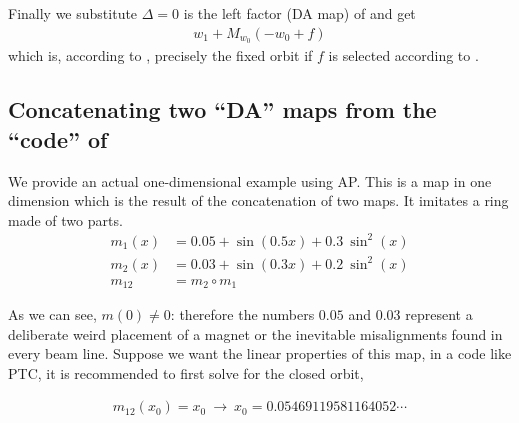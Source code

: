 \documentclass{hitec}     %
\begin{document}
{{{{{Finally we substitute $\Delta =0$ is the left factor (DA map) of  and get
%
\begin{align} {w}_{1}+{M}_{{w}_{0}}(-{w}_{0}+f)\nonumber 
\end{align}
which is, according to , precisely the fixed orbit if $f$ is selected according to . 

\subsection{Concatenating two ``DA'' maps from the ``code'' of }\label{s:exampleda}

We provide an actual one-dimensional example using AP. This is a map in one dimension which is the result of the concatenation of two maps. It imitates a ring made of two parts.  
%
\begin{align} {m}_{1}(x)&=0.05+\sin\left({0.5x}\right)+0.3\ {\sin}^{2}\left({x}\right)\nonumber \\
 {m}_{2}(x)&=0.03+\sin\left({0.3x}\right)+0.2\ {\sin}^{2}\left({x}\right)\nonumber \\
 {m}_{12}&={m}_{2}\circ {m}_{1}\label{eq:m12}\end{align}


As we can see, $m(0)\ne 0$: therefore the numbers $0.05$ and $0.03$  represent  a deliberate weird placement of a magnet or the inevitable misalignments found in every beam line.  Suppose we want the linear properties of this map, in a code like PTC, it is recommended to first solve for the closed orbit, 

%
\begin{align} m{}_{12}({x}_{0})=
{x}_{0}\ \rightarrow \ {x}_{0}=
0.05469119581164052\cdots\label{eq:m1t0}\end{align}


}}}}}
\end{document}
